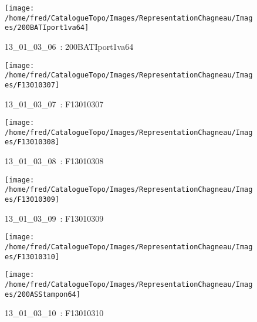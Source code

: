 \documentclass[12pt,titlepage,oneside]{book}
\begin{document}
\begin{figure}[h!]
  \begin{minipage}[t]{3cm}
    \begin{center}
      \texttt{[image: /home/fred/CatalogueTopo/Images/RepresentationChagneau/Images/200BATIport1va64]}
      \caption[~13\_01\_03\_06]{\small{13\_01\_03\_06~:} \tiny{200BATIport1va64}}\label{200BATIport1va64}
    \end{center}
  \end{minipage}
  \begin{minipage}[t]{3cm}
    \begin{center}
      \texttt{[image: /home/fred/CatalogueTopo/Images/RepresentationChagneau/Images/F13010307]}
      \caption[~13\_01\_03\_07]{\small{13\_01\_03\_07~:} \tiny{F13010307}}\label{F13010307}
    \end{center}
  \end{minipage}
  \begin{minipage}[t]{3cm}
    \begin{center}
      \texttt{[image: /home/fred/CatalogueTopo/Images/RepresentationChagneau/Images/F13010308]}
      \caption[~13\_01\_03\_08]{\small{13\_01\_03\_08~:} \tiny{F13010308}}\label{F13010308}
    \end{center}
  \end{minipage}
  \begin{minipage}[t]{3cm}
    \begin{center}
      \texttt{[image: /home/fred/CatalogueTopo/Images/RepresentationChagneau/Images/F13010309]}
      \caption[~13\_01\_03\_09]{\small{13\_01\_03\_09~:} \tiny{F13010309}}\label{F13010309}
    \end{center}
  \end{minipage}
  \begin{minipage}[t]{3cm}
    \begin{center}
      \texttt{[image: /home/fred/CatalogueTopo/Images/RepresentationChagneau/Images/F13010310]}
      \caption[~13\_01\_03\_10]{\small{13\_01\_03\_10~:} \tiny{F13010310}}\label{F13010310}
    \end{center}
  \end{minipage}
  \begin{minipage}[t]{3cm}
    \begin{center}
      \texttt{[image: /home/fred/CatalogueTopo/Images/RepresentationChagneau/Images/200ASStampon64]}

\end{center}
\end{minipage}
\end{figure}
\end{document}
